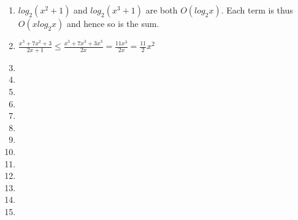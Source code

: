 \documentclass[11pt]{article}
\begin{document}
\begin{enumerate}
\item $log_2(x^2+1)$ and $log_2(x^3+1)$ are both $O(log_2x)$. Each term is thus $O(xlog_2x)$ and hence so is the sum.
\item $\frac{x^3+7x^2+3}{2x+1} \leq \frac{x^3+7x^3+3x^3}{2x} = \frac{11x^3}{2x} = \frac{11}{2}x^2$
\item 
\item 
\item 
\item 
\item 
\item 
\item 
\item 
\item 
\item 
\item 
\item 
\item 

\end{enumerate}
\end{document}
